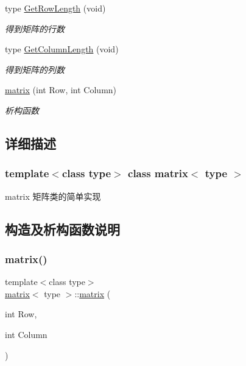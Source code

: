 \begin{DoxyCompactItemize}
$$type \mbox{\hyperlink{classmatrix_a1db0593aa62235f24143913564382990}{Get\+Row\+Length}} (void)
\begin{DoxyCompactList}\small\item\em 得到矩阵的行数 \end{DoxyCompactList}\item 
type \mbox{\hyperlink{classmatrix_aee9fe31d5065ec906cd0ed908cc127a1}{Get\+Column\+Length}} (void)
\begin{DoxyCompactList}\small\item\em 得到矩阵的列数 \end{DoxyCompactList}\item 
\mbox{\hyperlink{classmatrix_a2d0efaa46454804fcf45fae271002cf5}{matrix}} (int Row, int Column)
\begin{DoxyCompactList}\small\item\em 析构函数 \end{DoxyCompactList}\end{DoxyCompactItemize}


\subsection{详细描述}
\subsubsection*{template$<$class type$>$\newline
class matrix$<$ type $>$}

matrix 矩阵类的简单实现 

\subsection{构造及析构函数说明}
\mbox{\label{classmatrix_a2d0efaa46454804fcf45fae271002cf5}} 
\subsubsection{\texorpdfstring{matrix()}{matrix()}}
{\footnotesize\ttfamily template$<$class type$>$ \\
\mbox{\hyperlink{classmatrix}{matrix}}$<$ type $>$\+::\mbox{\hyperlink{classmatrix}{matrix}} (\begin{DoxyParamCaption}\item[{int}]{Row,  }\item[{int}]{Column }\end{DoxyParamCaption})\hspace{0.3cm}{\ttfamily [inline]}}




